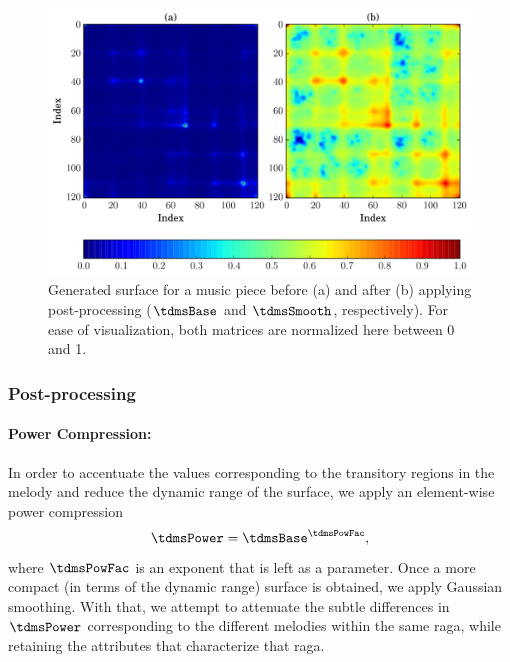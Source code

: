 \begin{figure}
	\begin{center}
		\includegraphics[width=\figSizeHundred]{ch07_ragaRecognition/figures/PSfeature_e59642ca-72bc-466b-bf4b-d82bfbc7b4af.pdf}
	\end{center}
	\caption[\acrfull{tdms} before and after post-processing]{Generated surface for a music piece before (a) and after (b) applying post-processing ($\tdmsBase$ and $\tdmsSmooth$, respectively). For ease of visualization, both matrices are normalized here between 0 and 1.}
	\label{fig:phase_space_surface}
\end{figure}

\subsubsection{Post-processing}
\label{sec:tdms_post_processing}

\paragraph{Power Compression:} In order to accentuate the values corresponding to the transitory regions in the melody and reduce the dynamic range of the surface, we apply an element-wise power compression
\begin{equation}
\label{eq:tdms_power_compression}	
\tdmsPower= \tdmsBase^\tdmsPowFac ,
\end{equation}
where $\tdmsPowFac$ is an exponent that is left as a parameter. Once a more compact (in terms of the dynamic range) surface is obtained, we apply Gaussian smoothing. With that, we attempt to attenuate the subtle differences in $\tdmsPower$ corresponding to the different melodies within the same \gls{raga}, while retaining the attributes that characterize that \gls{raga}. 

